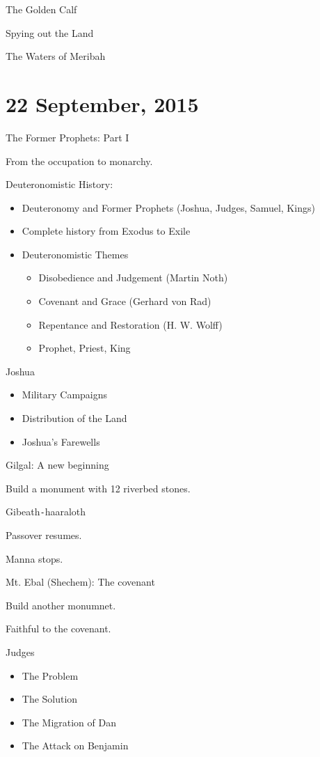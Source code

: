 \documentclass{article}
\begin{document}
    The Golden Calf

    Spying out the Land

    The Waters of Meribah

\section{22 September, 2015}

    \centerline{The Former Prophets: Part I}

    From the occupation to monarchy.

    Deuteronomistic History:

    \begin{itemize}
        \item Deuteronomy and Former Prophets (Joshua, Judges, Samuel, Kings)
        \item Complete history from Exodus to Exile
        \item{Deuteronomistic Themes \\ 
            \begin{itemize}
                \item Disobedience and Judgement (Martin Noth)
                \item Covenant and Grace (Gerhard von Rad)
                \item Repentance and Restoration (H. W. Wolff)
                \item Prophet, Priest, King
            \end{itemize}}
    \end{itemize}

    \centerline{Joshua}

    \begin{itemize}
        \item Military Campaigns
        \item Distribution of the Land
        \item Joshua's Farewells
    \end{itemize}

    Gilgal: A new beginning

    Build a monument with 12 riverbed stones.

    Gibeath\texttt{-}haaraloth

    Passover resumes.

    Manna stops.

    Mt. Ebal (Shechem): The covenant
    
    Build another monumnet.

    Faithful to the covenant.

    \centerline{Judges}

    \begin{itemize}
        \item The Problem
        \item The Solution
        \item The Migration of Dan
        \item The Attack on Benjamin
    \end{itemize}
\end{document}
